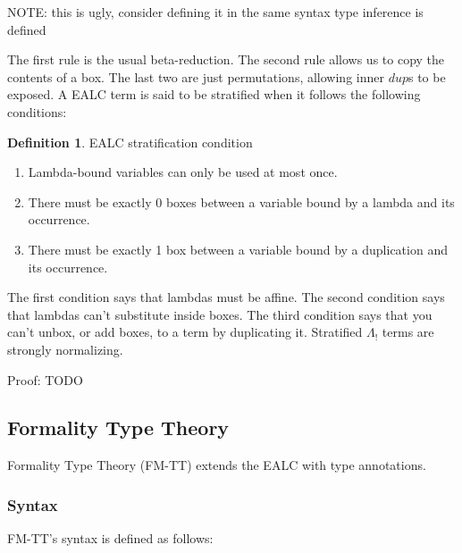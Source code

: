 \documentclass{article}
\theoremstyle{definition}
\newtheorem{definition}{Definition}
\theoremstyle{theorem}
\begin{document}
NOTE: this is ugly, consider defining it in the same syntax type inference is defined

The first rule is the usual beta-reduction. The second rule allows us to copy
the contents of a box. The last two are just permutations, allowing inner $dup$s
to be exposed. A EALC term is said to be stratified when it follows the
following conditions:

\begin{definition} EALC stratification condition
\begin{enumerate}
\item Lambda-bound variables can only be used at most once.
\item There must be exactly 0 boxes between a variable bound by a lambda and its
   occurrence.
\item There must be exactly 1 box between a variable bound by a duplication and its
   occurrence.
\end{enumerate}
\end{definition}

The first condition says that lambdas must be affine. The second condition says
that lambdas can't substitute inside boxes. The third condition says that you
can't unbox, or add boxes, to a term by duplicating it. Stratified $\Lambda_!$
terms are strongly normalizing. 

Proof: TODO

\subsection{Formality Type Theory}

Formality Type Theory (FM-TT) extends the EALC with type annotations.

\subsubsection{Syntax}
FM-TT's syntax is defined as follows:
\end{document}
